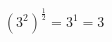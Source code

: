 \documentclass[preview]{standalone}
\begin{document}
\begin{align*}
(3^2)^{\frac{1}{2}} = 3^1 = 3
\end{align*}
\end{document}
